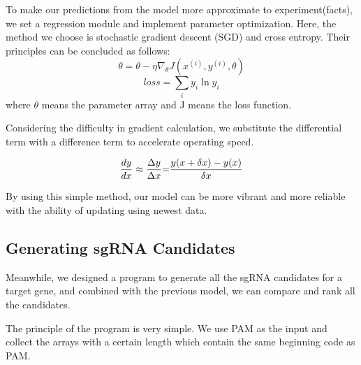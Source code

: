 To make our predictions from the model more approximate to experiment(facts), we set a regression module and implement parameter optimization. Here, the method we choose is stochastic gradient descent (SGD) and cross entropy. Their principles can be concluded as follows:
\begin{equation}
\theta  = \theta  - \eta {\nabla _\theta }J({x^{(i)}},{y^{(i)}},\theta )
\end{equation}
\begin{equation}
loss = \sum\limits_i {{y_i}\ln {y_i}}
\end{equation}
where $\theta$ means the parameter array and J means the loss function. 

Considering the difficulty in gradient calculation, we substitute the differential term with a difference term to accelerate operating speed.\par
\begin{equation}
\frac{{dy}}{{dx}} \approx \frac{{\Delta y}}{{\Delta x}}{\rm{ = }}\frac{{y(x + \delta x) - y(x)}}{{\delta x}}
\end{equation}

By using this simple method, our model can be more vibrant and more reliable with the ability of updating using newest data.

\subsection{Generating sgRNA Candidates}
Meanwhile, we designed a program to generate all the sgRNA candidates for a target gene, and combined with the previous model, we can compare and rank all the candidates.

The principle of the program  is very simple. We use PAM as the input and collect the arrays with a certain length which contain the same beginning code as PAM.

